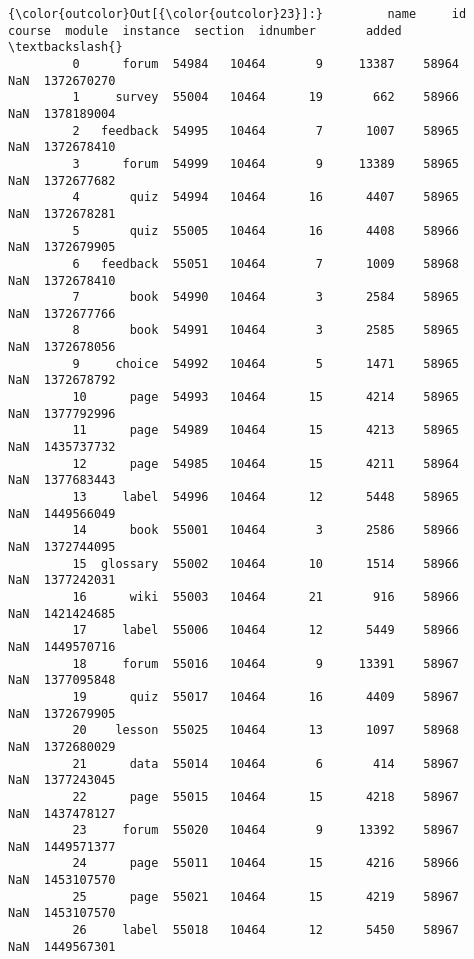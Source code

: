 \documentclass[11pt]{article}
\begin{document}
\begin{Verbatim}[commandchars=\\\{\}]
{\color{outcolor}Out[{\color{outcolor}23}]:}         name     id  course  module  instance  section  idnumber       added  \textbackslash{}
         0      forum  54984   10464       9     13387    58964       NaN  1372670270   
         1     survey  55004   10464      19       662    58966       NaN  1378189004   
         2   feedback  54995   10464       7      1007    58965       NaN  1372678410   
         3      forum  54999   10464       9     13389    58965       NaN  1372677682   
         4       quiz  54994   10464      16      4407    58965       NaN  1372678281   
         5       quiz  55005   10464      16      4408    58966       NaN  1372679905   
         6   feedback  55051   10464       7      1009    58968       NaN  1372678410   
         7       book  54990   10464       3      2584    58965       NaN  1372677766   
         8       book  54991   10464       3      2585    58965       NaN  1372678056   
         9     choice  54992   10464       5      1471    58965       NaN  1372678792   
         10      page  54993   10464      15      4214    58965       NaN  1377792996   
         11      page  54989   10464      15      4213    58965       NaN  1435737732   
         12      page  54985   10464      15      4211    58964       NaN  1377683443   
         13     label  54996   10464      12      5448    58965       NaN  1449566049   
         14      book  55001   10464       3      2586    58966       NaN  1372744095   
         15  glossary  55002   10464      10      1514    58966       NaN  1377242031   
         16      wiki  55003   10464      21       916    58966       NaN  1421424685   
         17     label  55006   10464      12      5449    58966       NaN  1449570716   
         18     forum  55016   10464       9     13391    58967       NaN  1377095848   
         19      quiz  55017   10464      16      4409    58967       NaN  1372679905   
         20    lesson  55025   10464      13      1097    58968       NaN  1372680029   
         21      data  55014   10464       6       414    58967       NaN  1377243045   
         22      page  55015   10464      15      4218    58967       NaN  1437478127   
         23     forum  55020   10464       9     13392    58967       NaN  1449571377   
         24      page  55011   10464      15      4216    58966       NaN  1453107570   
         25      page  55021   10464      15      4219    58967       NaN  1453107570   
         26     label  55018   10464      12      5450    58967       NaN  1449567301   

\end{Verbatim}
\end{document}
